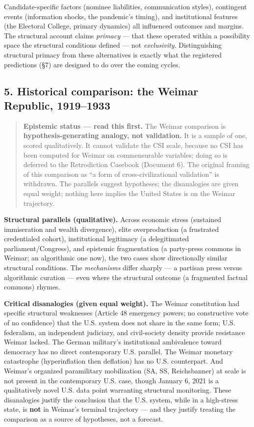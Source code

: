 \documentclass[
]{article}
\begin{document}
Candidate-specific factors (nominee liabilities, communication styles),
contingent events (information shocks, the pandemic's timing), and
institutional features (the Electoral College, primary dynamics) all
influenced outcomes and margins. The structural account claims
\emph{primacy} --- that these operated within a possibility space the
structural conditions defined --- not \emph{exclusivity}. Distinguishing
structural primacy from these alternatives is exactly what the
registered predictions (§7) are designed to do over the coming cycles.

\subsection{5. Historical comparison: the Weimar Republic,
1919--1933}\label{historical-comparison-the-weimar-republic-19191933}

\begin{quote}
\textbf{Epistemic status --- read this first.} The Weimar comparison is
\textbf{hypothesis-generating analogy, not validation.} It is a sample
of one, scored qualitatively. It cannot validate the CSI scale, because
no CSI has been computed for Weimar on commensurable variables; doing so
is deferred to the Retrodiction Casebook (Document 6). The original
framing of this comparison as ``a form of cross-civilizational
validation'' is withdrawn. The parallels suggest hypotheses; the
disanalogies are given equal weight; nothing here implies the United
States is on the Weimar trajectory.
\end{quote}

\textbf{Structural parallels (qualitative).} Across economic stress
(sustained immiseration and wealth divergence), elite overproduction (a
frustrated credentialed cohort), institutional legitimacy (a
delegitimated parliament/Congress), and epistemic fragmentation (a
party-press commons in Weimar; an algorithmic one now), the two cases
show directionally similar structural conditions. The \emph{mechanisms}
differ sharply --- a partisan press versus algorithmic curation --- even
where the structural outcome (a fragmented factual commons) rhymes.

\textbf{Critical disanalogies (given equal weight).} The Weimar
constitution had specific structural weaknesses (Article 48 emergency
powers; no constructive vote of no confidence) that the U.S. system does
not share in the same form; U.S. federalism, an independent judiciary,
and civil-society density provide resistance Weimar lacked. The German
military's institutional ambivalence toward democracy has no direct
contemporary U.S. parallel. The Weimar monetary catastrophe
(hyperinflation then deflation) has no U.S. counterpart. And Weimar's
organized paramilitary mobilization (SA, SS, Reichsbanner) at scale is
not present in the contemporary U.S. case, though January 6, 2021 is a
qualitatively novel U.S. data point warranting structural monitoring.
These disanalogies justify the conclusion that the U.S. system, while in
a high-stress state, is \textbf{not} in Weimar's terminal trajectory ---
and they justify treating the comparison as a source of hypotheses, not
a forecast.
\end{document}
